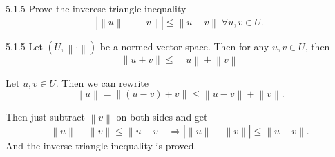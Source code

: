 \documentclass[a4paper,norsk]{article}
\renewcommand{\leq}{\leqslant}
\begin{document}
\begin{oppgavebox}{5.1.5}{}
Prove the inverese triangle inequality
\[
    \left| \left\lVert u \right\rVert - \left\lVert v \right\rVert  \right| \leq \left\lVert u - v \right\rVert \; \forall  u, v \in U.
\]

\begin{proofbox}{5.1.5}{}
  Let $ \left( U, \left\lVert \cdot \right\rVert  \right)  $ be a normed vector space. Then for any $ u, v \in U $, then
  \[
      \left\lVert u + v \right\rVert \leq \left\lVert u \right\rVert + \left\lVert v \right\rVert 
  \]


  Let $ u, v \in U $. Then we can rewrite
  \[
      \left\lVert u \right\rVert = \left\lVert \left( u - v \right) + v \right\rVert \leq \left\lVert u-v \right\rVert + \left\lVert v \right\rVert.
  \]

  Then just subtract $ \left\lVert v \right\rVert  $ on both sides and get
  \[
      \left\lVert u \right\rVert - \left\lVert v \right\rVert \leq \left\lVert u-v \right\rVert  \Rightarrow \left| \left\lVert u \right\rVert - \left\lVert v \right\rVert  \right| \leq \left\lVert u-v \right\rVert.
  \]
  And the inverse triangle inequality is proved.
\end{proofbox}
\end{oppgavebox}
\end{document}
